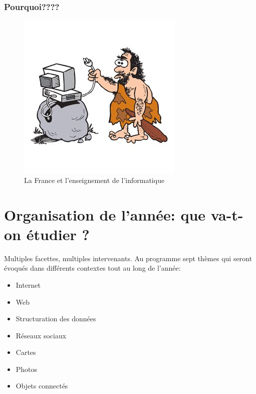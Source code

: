 \documentclass[french]{beamer}
\begin{document}
\begin{frame}\frametitle{Pourquoi????}


  \begin{figure}
\centering
\includegraphics{caveman.jpg}
\caption{La France et l'enseignement de l'informatique}
\end{figure}
  
\end{frame}




\section{Organisation de l'année: que va-t-on étudier ?}

\begin{frame}
\protect\hypertarget{organisation-de-lannuxe9e-que-va-t-on-uxe9tudier}{}

Multiples facettes, multiples intervenants. Au programme sept thèmes qui
seront évoqués dans différents contextes tout au long de l'année:

\begin{itemize}
\tightlist
\item
  Internet
\item
  Web
\item
  Structuration des données
\item
  Réseaux sociaux
\item
  Cartes
\item
  Photos
\item
  Objets connectés
\end{itemize}

\end{frame}
\end{document}
